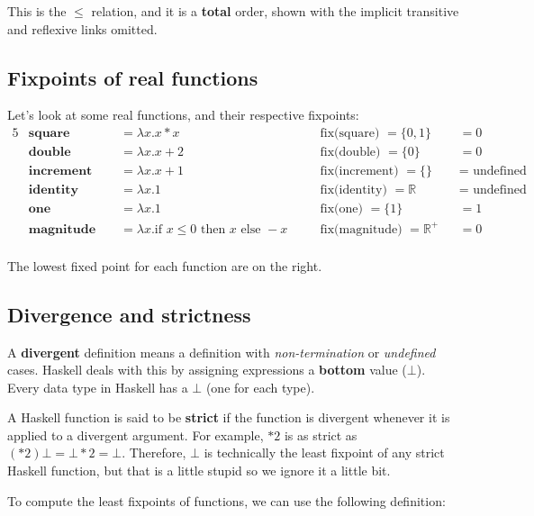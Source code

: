 \documentclass[11pt,a4paper,titlepage,dvipsnames,cmyk]{scrartcl}
\begin{document}
This is the $\le$ relation, and it is a \textbf{total} order, shown with the
implicit transitive and reflexive links omitted.

\subsection{Fixpoints of real functions}%
\label{sub:real-fixpoints}
Let's look at some real functions, and their respective fixpoints:
\begin{alignat*}{5}
    &\textbf{square } &&= \lambda x . x*x &&\text{fix(square) } = \{0,1\}
    &&= 0\\
    &\textbf{double } &&= \lambda x . x+2 &&\text{fix(double) } = \{0\} &&= 0\\
    &\textbf{increment } &&= \lambda x.x+1 &&\text{fix(increment) } = \{\} &&=
    \text{ undefined }\\
    &\textbf{identity } &&= \lambda x . 1 &&\text{fix(identity) } =
    \mathbb{R} &&= \text{ undefined }\\
               &\textbf{one } &&= \lambda x . 1 &&\text{fix(one) } =
    \{1\} &&= 1\\
               &\textbf{magnitude } &&= \lambda x . \text{if } x \le 0 \text{ then } x
    \text{ else } -x \quad &&\text{fix(magnitude) } = \mathbb{R}^+ &&= 0\\
\end{alignat*}

The lowest fixed point for each function are on the right.

\subsection{Divergence and strictness}%
\label{sub:divergence-strictness}
A \textbf{divergent} definition means a definition with
\textit{non-termination} or \textit{undefined} cases. Haskell deals with
this by assigning expressions a \textbf{bottom} value ($\bot$). Every data
type in Haskell has a $\bot$ (one for each type).

A Haskell function is said to be \textbf{strict} if the function is
divergent whenever it is applied to a divergent argument. For example,
$*2$ is as strict as $(*2) \bot = \bot * 2 = \bot$. Therefore, $\bot$ is
technically the least fixpoint of any strict Haskell function, but that is
a little stupid so we ignore it a little bit.

To compute the least fixpoints of functions, we can use the following
definition:
\end{document}
